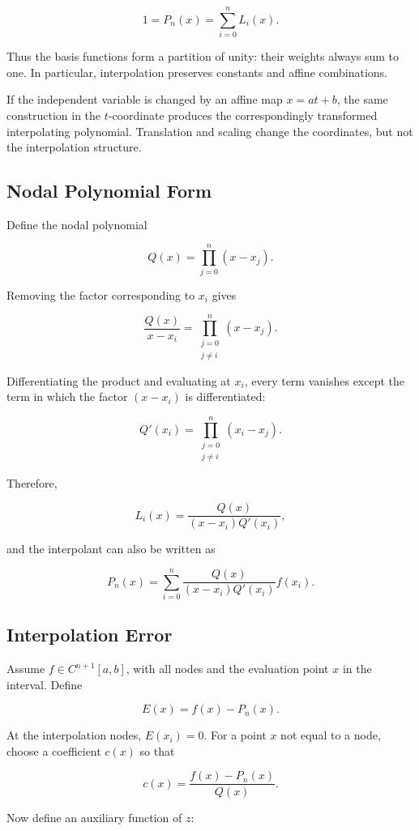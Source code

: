\documentclass[12pt, a4paper]{article}
\theoremstyle{break}
\begin{document}
\[
1=P_n(x)=\sum_{i=0}^n L_i(x).
\]

Thus the basis functions form a partition of unity: their weights always sum to one. In particular, interpolation preserves constants and affine combinations.

If the independent variable is changed by an affine map \(x=at+b\), the same construction in the \(t\)-coordinate produces the correspondingly transformed interpolating polynomial. Translation and scaling change the coordinates, but not the interpolation structure.

\subsection{Nodal Polynomial Form}\label{nodal-polynomial-form}

Define the nodal polynomial

\[
Q(x)=\prod_{j=0}^n(x-x_j).
\]

Removing the factor corresponding to \(x_i\) gives

\[
\frac{Q(x)}{x-x_i}=\prod_{\substack{j=0\\j\ne i}}^n(x-x_j).
\]

Differentiating the product and evaluating at \(x_i\), every term vanishes except the term in which the factor \((x-x_i)\) is differentiated:

\[
Q'(x_i)=\prod_{\substack{j=0\\j\ne i}}^n(x_i-x_j).
\]

Therefore,

\[
L_i(x)=\frac{Q(x)}{(x-x_i)Q'(x_i)},
\]

and the interpolant can also be written as

\[
P_n(x)=\sum_{i=0}^n
\frac{Q(x)}{(x-x_i)Q'(x_i)}f(x_i).
\]

\subsection{Interpolation Error}\label{interpolation-error}

Assume \(f\in C^{n+1}[a,b]\), with all nodes and the evaluation point \(x\) in the interval. Define

\[
E(x)=f(x)-P_n(x).
\]

At the interpolation nodes, \(E(x_i)=0\). For a point \(x\) not equal to a node, choose a coefficient \(c(x)\) so that

\[
c(x)=\frac{f(x)-P_n(x)}{Q(x)}.
\]

Now define an auxiliary function of \(z\):
\end{document}
